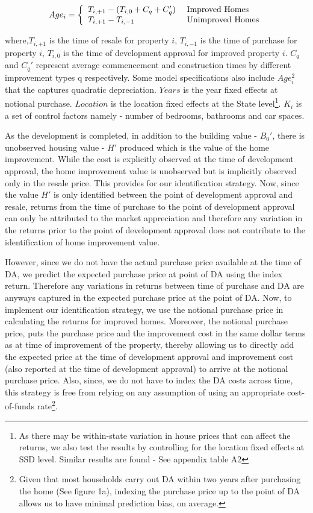 \documentclass[AEJ,reqno, draftmode]{AEA} %
\begin{document}
\begin{equation}
    Age_i = \left\{
    \begin{array}{l l}
      T_{i,+1}-(T_{i,0} + C_q + C_q') & \text{ Improved Homes}\\
      T_{i,+1}-T_{i,-1}  & \text{ Unimproved Homes} \\
    \end{array} \right.
\end{equation}

where,$T_{i,+1}$ is the time of resale for property $i$, $T_{i,-1}$ is the time of purchase for property $i$, $T_{i,0}$ is the time of development approval for improved property $i$. $C_q$ and $C_q'$ represent average commencement and construction times by different improvement types q respectively. Some model specifications also include $Age_i^2$ that the captures quadratic depreciation. $Years$ is the year fixed effects at notional purchase. $Location$ is the location fixed effects at the State level\footnote{As there may be within-state variation in house prices that can affect the returns, we also test the results by controlling for the location fixed effects at SSD level. Similar results are found - See appendix table A2}. $K_i$ is a set of control factors namely - number of bedrooms, bathrooms and car spaces.


As the development is completed, in addition to the building value - $B_0'$, there is unobserved housing value - $H'$ produced which is the value of the home improvement. While the cost is explicitly observed at the time of development approval, the home improvement value is unobserved but is implicitly observed only in the resale price. This provides for our identification strategy. Now, since the value $H'$ is only identified between the point of development approval and resale, returns from the time of purchase to the point of development approval can only be attributed to the market appreciation and therefore any variation in the returns prior to the point of development approval does not contribute to the identification of home improvement value. 

However, since we do not have the actual purchase price available at the time of DA, we predict the expected purchase price at point of DA using the index return. Therefore any variations in returns between time of purchase and DA are anyways captured in the expected purchase price at the point of DA. Now, to implement our identification strategy, we use the notional purchase price in calculating the returns for improved homes. Moreover, the notional purchase price, puts the purchase price and the improvement cost in the same dollar terms as at time of improvement of the property, thereby allowing us to directly add the expected price at the time of development approval and improvement cost (also reported at the time of development approval) to arrive at the notional purchase price. Also, since, we do not have to index the DA costs across time, this strategy is free from relying on any assumption of using an appropriate cost-of-funds rate\footnote{Given that most households carry out DA within two years after purchasing the home (See figure 1a), indexing the purchase price up to the point of DA allows us to have minimal prediction bias, on average.}. 
\end{document}
